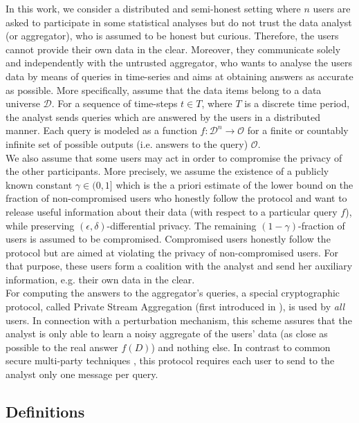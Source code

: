 \documentclass[10pt]{extarticle}
\begin{document}
In this work, we consider a distributed and semi-honest setting where $n$ users are asked to participate in some statistical analyses but do not trust the data analyst (or aggregator), who is assumed to be honest but curious. Therefore, the users cannot provide their own data in the clear. Moreover, they communicate solely and independently with the untrusted aggregator, who wants to analyse the users data by means of queries in time-series and aims at obtaining answers as accurate as possible. More specifically, assume that the data items belong to a data universe $\mathcal{D}$. For a sequence of time-steps $t\in T$, where $T$ is a discrete time period, the analyst sends queries which are answered by the users in a distributed manner. Each query is modeled as a function $f:\mathcal{D}^n\to \mathcal{O}$ for a finite or countably infinite set of possible outputs (i.e. answers to the query) $\mathcal{O}$.\\ 
We also assume that some users may act in order to compromise the privacy of the other participants. More precisely, we assume the existence of a publicly known constant $\gamma\in(0,1]$ which is the a priori estimate of the lower bound on the fraction 
of non-compromised users who honestly follow the protocol and want to release useful information about their data (with respect to a particular query $f$), while preserving $(\epsilon,\delta)$-differential privacy. 
The remaining $(1-\gamma)$-fraction of users is assumed to be compromised. Compromised users honestly follow the protocol but are aimed at violating the privacy of non-compromised users.
For that purpose, these users form a coalition with the analyst and send her auxiliary information, e.g. their own data in the clear.\\ For computing the answers to the aggregator's queries, a special cryptographic protocol, called Private Stream Aggregation (first introduced in \cite{2}), is used by \textit{all} users. In connection with a perturbation mechanism, this scheme assures that the analyst is only able to learn a noisy aggregate of the users' data (as close as possible to the real answer $f(D)$) and nothing else. In contrast to common secure multi-party techniques \cite{25, 6, 20}, this protocol requires each user to send to the analyst only one message per query. 

\subsection{Definitions}
\end{document}
